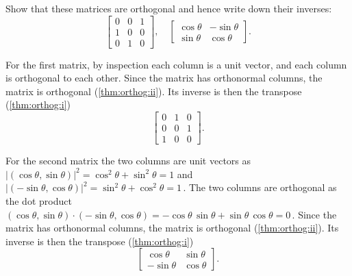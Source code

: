 \begin{example} 
Show that these matrices are orthogonal and hence write down their inverses:
\begin{equation*}
\begin{bmatrix} 0&0&1\\1&0&0\\0&1&0 \end{bmatrix},\quad
\begin{bmatrix} \cos\theta&-\sin\theta\\\sin\theta&\cos\theta \end{bmatrix}.
\end{equation*}

\begin{solution} 
For the first matrix, by inspection each column is a unit vector, and each column is orthogonal to each other. 
Since the matrix has orthonormal columns, the matrix is orthogonal (\cref{thm:orthog:ii}).
Its inverse is then the transpose (\cref{thm:orthog:i})
\begin{equation*}
\begin{bmatrix} 0&1&0\\0&0&1\\1&0&0 \end{bmatrix}.
\end{equation*}

For the second matrix the two columns are unit vectors as
\(|(\cos\theta,\sin\theta)|^2=\cos^2\theta+\sin^2\theta=1\) and \(|(-\sin\theta,\cos\theta)|^2=\sin^2\theta+\cos^2\theta=1\)\,.
The two columns are orthogonal as the dot product \((\cos\theta,\sin\theta)\cdot(-\sin\theta,\cos\theta)=-\cos\theta\,\sin\theta+\sin\theta\,\cos\theta=0\)\,.  
Since the matrix has orthonormal columns, the matrix is orthogonal (\cref{thm:orthog:ii}).
Its inverse is then the transpose (\cref{thm:orthog:i})
\begin{equation*}
\begin{bmatrix} \cos\theta&\sin\theta\\-\sin\theta&\cos\theta \end{bmatrix}.
\end{equation*}
\end{solution}
\end{example}




